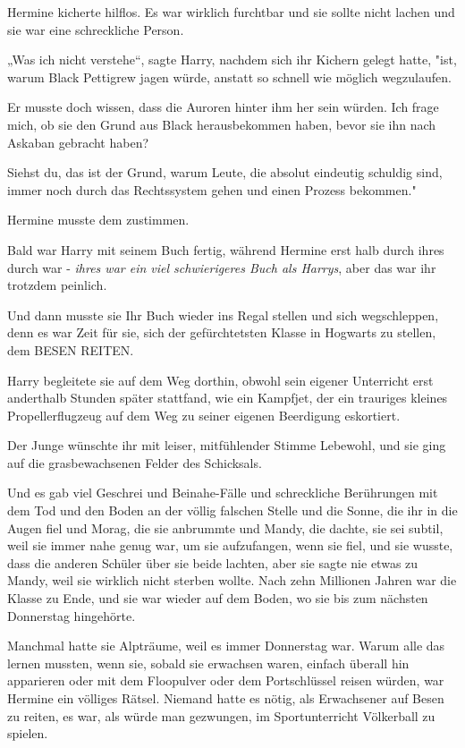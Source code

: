 {Hermine kicherte hilflos. Es war wirklich furchtbar und sie sollte nicht lachen und sie war eine schreckliche Person.

„Was ich nicht verstehe“, sagte Harry, nachdem sich ihr Kichern gelegt hatte, "ist, warum Black Pettigrew jagen würde, anstatt so schnell wie möglich wegzulaufen.

Er musste doch wissen, dass die Auroren hinter ihm her sein würden. Ich frage mich, ob sie den Grund aus Black herausbekommen haben, bevor sie ihn nach Askaban gebracht haben?

Siehst du, das ist der Grund, warum Leute, die absolut eindeutig schuldig sind, immer noch durch das Rechtssystem gehen und einen Prozess bekommen."

Hermine musste dem zustimmen.

Bald war Harry mit seinem Buch fertig, während Hermine erst halb durch ihres durch war - \emph{ihres war ein viel schwierigeres Buch als Harrys}, aber das war ihr trotzdem peinlich.

Und dann musste sie Ihr Buch wieder ins Regal stellen und sich wegschleppen, denn es war Zeit für sie, sich der gefürchtetsten Klasse in Hogwarts zu stellen, dem BESEN REITEN.

Harry begleitete sie auf dem Weg dorthin, obwohl sein eigener Unterricht erst anderthalb Stunden später stattfand, wie ein Kampfjet, der ein trauriges kleines Propellerflugzeug auf dem Weg zu seiner eigenen Beerdigung eskortiert.

Der Junge wünschte ihr mit leiser, mitfühlender Stimme Lebewohl, und sie ging auf die grasbewachsenen Felder des Schicksals.

Und es gab viel Geschrei und Beinahe-Fälle und schreckliche Berührungen mit dem Tod und den Boden an der völlig falschen Stelle und die Sonne, die ihr in die Augen fiel und Morag, die sie anbrummte und Mandy, die dachte, sie sei subtil, weil sie immer nahe genug war, um sie aufzufangen, wenn sie fiel, und sie wusste, dass die anderen Schüler über sie beide lachten, aber sie sagte nie etwas zu Mandy, weil sie wirklich nicht sterben wollte. Nach zehn Millionen Jahren war die Klasse zu Ende, und sie war wieder auf dem Boden, wo sie bis zum nächsten Donnerstag hingehörte.

Manchmal hatte sie Alpträume, weil es immer Donnerstag war. Warum alle das lernen mussten, wenn sie, sobald sie erwachsen waren, einfach überall hin apparieren oder mit dem Floopulver oder dem Portschlüssel reisen würden, war Hermine ein völliges Rätsel. Niemand hatte es nötig, als Erwachsener auf Besen zu reiten, es war, als würde man gezwungen, im Sportunterricht Völkerball zu spielen.

}
